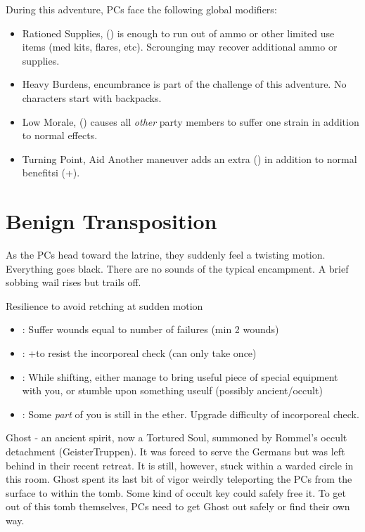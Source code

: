 \documentclass{book}
\newcommand{\df}{\DifficultyDie }
\newcommand{\ch}{\ChallengeDie }
\newcommand{\bbb}{\BoostDie }
\begin{document}
\begin{multicols}{2}
    During this adventure, PCs face the following global modifiers:

    \begin{itemize}
        \item Rationed Supplies, (\Threat\Threat) is enough to run out of ammo or other limited use items (med kits, flares, etc).  Scrounging may recover additional ammo or supplies.
        \item Heavy Burdens, encumbrance is part of the challenge of this adventure.  No characters start with backpacks.
        \item Low Morale, (\Despair) causes all \emph{other} party members to suffer one strain in addition to normal effects.
        \item Turning Point, Aid Another maneuver adds an extra (\Advantage\Advantage) in addition to normal benefitsi (+\bbb).
    \end{itemize}

\section{Benign Transposition}

As the PCs head toward the latrine, they suddenly feel a twisting motion.  Everything goes black.  There are no sounds of the typical encampment.  A brief sobbing wail rises but trails off.

\ch\df Resilience to avoid retching at sudden motion
    \begin{itemize}
        \item \Failure: Suffer wounds equal to number of failures (min 2 wounds)
        \item \Advantage: +\bbb to resist the incorporeal check (can only take once)
        \item \Triumph: While shifting, either manage to bring useful piece of special equipment with you, or stumble upon something useulf (possibly ancient/occult)
        \item \Despair: Some \emph{part} of you is still in the ether.  Upgrade difficulty of incorporeal check.
    \end{itemize}

    Ghost - an ancient spirit, now a Tortured Soul, summoned by Rommel's occult detachment (GeisterTruppen).  It was forced to serve the Germans but was left behind in their recent retreat.  It is still, however, stuck within a warded circle in this room.  Ghost spent its last bit of vigor weirdly teleporting the PCs from the surface to within the tomb.  Some kind of occult key could safely free it.  To get out of this tomb themselves, PCs need to get Ghost out safely or find their own way.


\end{multicols}
\end{document}
